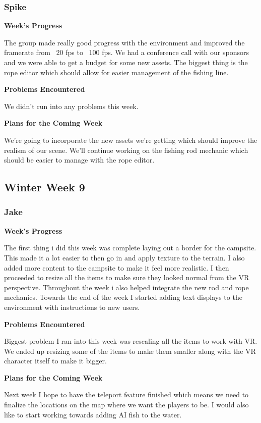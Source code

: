 \documentclass[10pt,journal,compsoc,onecolumn, draftclsnofoot]{IEEEtran}
\begin{document}
\subsubsection{Spike}
\noindent \textbf{Week's Progress}

The group made really good progress with the environment and improved the framerate from ~20 fps to ~100 fps. We had a conference call with our sponsors and we were able to get a budget for some new assets. The biggest thing is the rope editor which should allow for easier management of the fishing line.

\noindent \textbf{Problems Encountered}

We didn't run into any problems this week.

\noindent \textbf{Plans for the Coming Week}

We're going to incorporate the new assets we're getting which should improve the realism of our scene. We'll continue working on the fishing rod mechanic which should be easier to manage with the rope editor.

\subsection{Winter Week 9}
\subsubsection{Jake}
\noindent \textbf{Week's Progress}

The first thing i did this week was complete laying out a border for the campsite. This made it a lot easier to then go in and apply texture to the terrain. I also added more content to the campsite to make it feel more realistic. I then proceeded to resize all the items to make sure they looked normal from the VR perspective. Throughout the week i also helped integrate the new rod and rope mechanics. Towards the end of the week I started adding text displays to the environment with instructions to new users.

\noindent \textbf{Problems Encountered}

Biggest problem I ran into this week was rescaling all the items to work with VR. We ended up resizing some of the items to make them smaller along with the VR character itself to make it bigger.

\noindent \textbf{Plans for the Coming Week}

Next week I hope to have the teleport feature finished which means we need to finalize the locations on the map where we want the players to be. I would also like to start working towards adding AI fish to the water.
\end{document}
